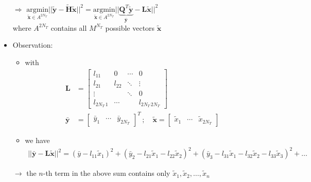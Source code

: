 \documentclass[a4paper, 10pt]{article}
\begin{document}
\begin{itemize}
\begin{align*}
	\end{align*}		 
	\item[$\Rightarrow $] $ \underset{\tilde{\mathbf{x}} \in A^{2N_T}}{\text{argmin}} ||\tilde{\mathbf{y}} - \tilde{\mathbf{H}}\tilde{\mathbf{x}}||^2 = \underset{\tilde{\mathbf{x}} \in A^{2N_T}}{\text{argmin}} ||\underbrace{\mathbf{Q}^T\tilde{\mathbf{y}}}_{\bar{\mathbf{y}}} - \mathbf{L}\tilde{\mathbf{x}}||^2$\\
	 where $A^{2N_T} $ contains all $ M^{N_T} $ possible vectors $\tilde{\mathbf{x}}$
	\item Observation:
	\begin{itemize}
		\item with
		\begin{align*}
			\mathbf{L} &= 
			\begin{bmatrix}
				l_{11} & 0 & \cdots & 0 \\
				l_{21} & l_{22} & \ddots &	\vdots \\
				\vdots & & \ddots & 0\\
				l_{2N_T\,1} & \cdots & & l_{2N_T\,2N_T}
			\end{bmatrix}\\
			\bar{\mathbf{y}} &= 
			 \begin{bmatrix}
			 	\bar{y}_1 & \cdots	& \bar{y}_{2N_T}
			 \end{bmatrix}^T \, ;\quad	
			 \tilde{\mathbf{x}} =
			 \begin{bmatrix}
			 	\tilde{x}_1 & \cdots	 & \tilde{x}_{2N_T}
			 \end{bmatrix}		 
		\end{align*}
		\item we have 
		\begin{align}\label{Sphere_Decoding_Formel_1}
			||\bar{\mathbf{y}} - \mathbf{L}\tilde{\mathbf{x}}||^2 = (\bar{y} - l_{11}\tilde{x}_1)^2 + (\bar{y}_2 - l_{21}\tilde{x}_1 - l_{22}\tilde{x}_2)^2 + (\bar{y}_3 - l_{31}\tilde{x}_1 - l_{32}\tilde{x}_2 - l_{33}\tilde{x}_3)^2 + \ldots
		\end{align}
		\end{itemize}
		\item[$\rightarrow$] the $n$-th term in the above sum contains only $ \tilde{x}_1, \tilde{x}_2, \ldots,\tilde{x}_n $
\end{itemize}
\end{document}
